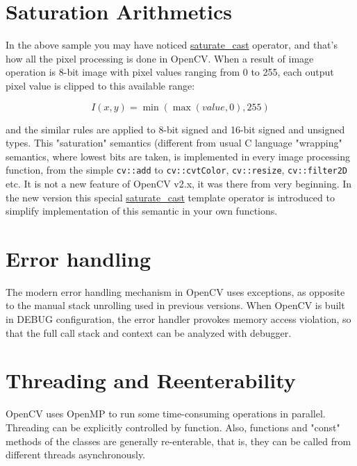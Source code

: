 \section{Saturation Arithmetics}

In the above sample you may have noticed \hyperref[saturatecast]{saturate\_cast} operator, and that's how all the pixel processing is done in OpenCV. When a result of image operation is 8-bit image with pixel values ranging from 0 to 255, each output pixel value is clipped to this available range:

\[
I(x,y)=\min(\max(value, 0), 255)
\]

and the similar rules are applied to 8-bit signed and 16-bit signed and unsigned types. This "saturation" semantics (different from usual C language "wrapping" semantics, where lowest bits are taken, is implemented in every image processing function, from the simple \texttt{cv::add} to \texttt{cv::cvtColor}, \texttt{cv::resize}, \texttt{cv::filter2D} etc.
It is not a new feature of OpenCV v2.x, it was there from very beginning. In the new version this special \hyperref[saturatecast]{saturate\_cast} template operator is introduced to simplify implementation of this semantic in your own functions.


\section{Error handling}

The modern error handling mechanism in OpenCV uses exceptions, as opposite to the manual stack unrolling used in previous versions. When OpenCV is built in DEBUG configuration, the error handler provokes memory access violation, so that the full call stack and context can be analyzed with debugger.

\section{Threading and Reenterability}

OpenCV uses OpenMP to run some time-consuming operations in parallel. Threading can be explicitly controlled by  function. Also, functions and "const" methods of the classes are generally re-enterable, that is, they can be called from different threads asynchronously.

\fi
